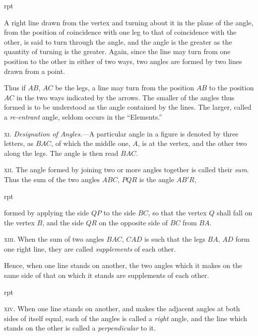 \documentclass[oneside]{book}
\newcounter{wrapwidth}
\newcommand\imgflow[3]{
\setcounter{wrapwidth}{#1}

\begin{wrapfigure}[#2]{r}{\value{wrapwidth}pt}
\begin{center}
\vspace{-0.3in}

\end{center}
\end{wrapfigure}
}
\newcommand\imgcent[2]{
\begin{center}

\end{center}
}
\begin{document}
\imgflow{113}{11}{f001}
\begin{footnotesize}
A right line drawn from the vertex and turning about it in the
plane of the angle, from the position of coincidence with one leg
to that of coincidence with the other, is said to turn through the
angle, and the angle is the greater as the quantity of turning is
the greater. Again, since the line may turn from one position to
the other in either of two ways, two angles are formed by two
lines drawn from a point.

Thus if $AB$, $AC$ be the legs, a line
may turn from the position $AB$ to the
position $AC$ in the two ways indicated
by the arrows. The smaller of the angles
thus formed is to be understood as
the angle contained by the lines. The
larger, called a \textit{re-entrant} angle, seldom
occurs in the ``Elements.''
\par\end{footnotesize}

\textsc{xi.} \textit{Designation of Angles.}---A particular angle in a
figure is denoted by three letters, as $BAC$, of which the
middle one, $A$, is at the vertex, and the other two along
the legs. The angle is then read $BAC$.


\imgcent{300}{f002}

\textsc{xii.} The angle formed by joining two or more angles
together is called their \textit{sum}. Thus the sum of the two
angles $ABC$, $PQR$ is the angle $AB'R$,
\imgflow{129}{7}{f003}

formed by applying
the side $QP$ to the side $BC$, so that the vertex $Q$ shall
fall on the vertex $B$, and the
side $QR$ on the opposite side
of $BC$ from $BA$.

\textsc{xiii.} When the sum of two
angles $BAC$, $CAD$ is such that
the legs $BA$, $AD$ form one right
line, they are called \textit{supplements} of each other.

\begin{footnotesize}
Hence, when one line stands on another, the two angles which
it makes on the same side of that on which it stands are supplements
of each other.
\par\end{footnotesize}




\imgflow{121}{7}{f004}
\textsc{xiv}. When one line stands on another, and makes
the adjacent angles at both
sides of itself equal, each of
the angles is called a \textit{right}
angle, and the line which
stands on the other is called
a \textit{perpendicular} to it.
\end{document}
